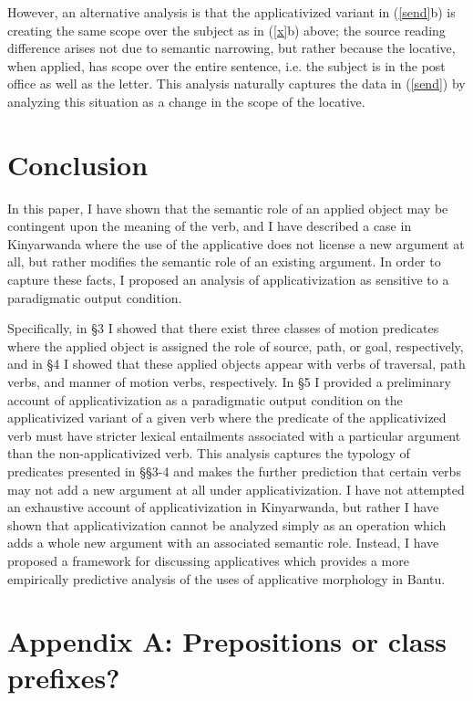 \documentclass[output=paper]{langsci/langscibook}
\begin{document}
 However, an alternative analysis is that the applicativized variant in (\ref{send}b) is creating the same scope over the subject as in (\ref{x}b) above; the {\sc source} reading difference arises not due to semantic narrowing, but rather because the locative, when applied, has scope over the entire sentence, i.e. the subject is in the post office as well as the letter. This analysis naturally captures the data in (\ref{send}) by analyzing this situation as a change in the scope of the locative.
 \fi
 \section{Conclusion}%
 
  
 In this paper, I have shown that the semantic role of an applied object may be contingent upon the meaning of the verb, and I have described a case in Kinyarwanda where the use of the applicative does not license a new argument at all, but rather modifies the semantic role of an existing argument. In order to capture these facts, I proposed an analysis of applicativization as sensitive to a paradigmatic output condition. 
 
 Specifically, in \S3 I showed that there exist three classes of motion predicates where the applied object is assigned the role of {\sc source, path,} or {\sc goal,} respectively, and in \S4 I showed that  these applied objects appear with verbs of traversal, path verbs, and manner of motion verbs, respectively. In \S5 I provided a preliminary account of applicativization as a paradigmatic output condition on the applicativized variant of a given verb where the predicate of the applicativized verb must have stricter lexical entailments associated with a particular argument than the non-applicativized verb. This analysis captures the typology of predicates presented in \S\S3-4 and makes the further prediction that certain verbs may not add a new argument at all under applicativization. I have not attempted an exhaustive account of applicativization in Kinyarwanda, but rather I have shown that applicativization cannot be analyzed simply as an operation which adds a whole new argument with an associated semantic role. Instead, I have proposed a framework for discussing applicatives which provides a more empirically predictive analysis of the uses of applicative morphology in Bantu. 
 
 
 \section*{Appendix A: Prepositions or class prefixes?}
 
\end{document}
